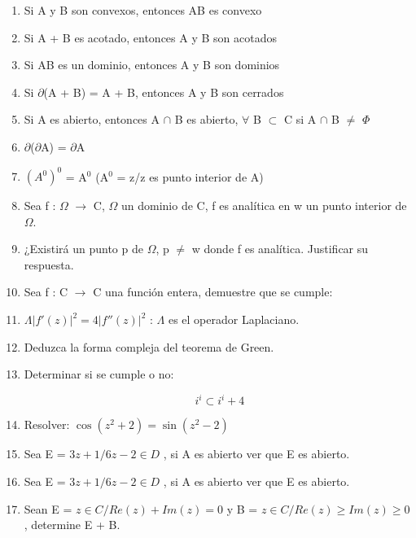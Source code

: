 \documentclass[a4paper,12pt]{article}
\begin{document}
\begin{enumerate}
\item Si A y B son convexos, entonces AB es convexo

\item Si A + B es acotado, entonces A y B son acotados

\item Si AB es un dominio, entonces A y B son dominios

\item Si $\partial$(A + B) = A + B, entonces A y B son cerrados

\item Si A es abierto, entonces A $\cap$ B es abierto, $\forall$ B $\subset$ C si A $\cap$ B $\neq$ $\Phi$

\item  $\partial$($\partial$A) = $\partial$A

\item  $\left(A^0\right)^0$ = A$^0$ (A$^0$ = {z/z es punto interior de A})

\item  Sea f : $\Omega$ $\rightarrow$ C, $\Omega$ un dominio de C, f es analítica en w un punto interior de $\Omega$.

\item ¿Existirá un punto p de $\Omega$, p $\neq$ w donde f es analítica. Justificar su respuesta.

\item Sea f : C $\rightarrow$ C una función entera, demuestre que se cumple:

\item   \(\Lambda |f'(z)|^2 = 4 |f''(z)|^2\) : \(\Lambda\) es el operador Laplaciano.

\item   Deduzca la forma compleja del teorema de Green.

\item  Determinar si se cumple o no:

\[ i^i \subset i^i + 4 \]

\item   Resolver: \(\cos(z^2 + 2) = \sin(z^2 - 2)\)

\item   Sea E = { \(3z + 1 / 6z - 2 \in D\) }, si A es abierto ver que E es abierto.

\item  Sea E = { \(3z + 1 / 6z - 2 \in D\) }, si A es abierto ver que E es abierto.

\item  Sean E = { \(z \in C / Re(z) + Im(z) = 0\) } y B = { \(z \in C / Re(z) \geq Im(z) \geq 0\) }, determine E + B.


\end{enumerate}
\end{document}
